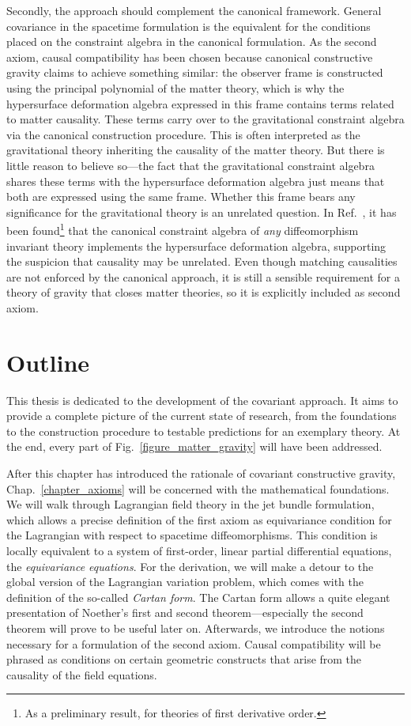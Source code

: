 Secondly, the approach should complement the canonical framework. General covariance in the spacetime formulation is the equivalent for the conditions placed on the constraint algebra in the canonical formulation. As the second axiom, causal compatibility has been chosen because canonical constructive gravity claims to achieve something similar: the observer frame is constructed using the principal polynomial of the matter theory, which is why the hypersurface deformation algebra expressed in this frame contains terms related to matter causality. These terms carry over to the gravitational constraint algebra via the canonical construction procedure. This is often interpreted as the gravitational theory inheriting the causality of the matter theory. But there is little reason to believe so---the fact that the gravitational constraint algebra shares these terms with the hypersurface deformation algebra just means that both are expressed using the same frame. Whether this frame bears any significance for the gravitational theory is an unrelated question. In Ref.\ \cite{Reinhart_2019}, it has been found\footnote{As a preliminary result, for theories of first derivative order.} that the canonical constraint algebra of \emph{any} diffeomorphism invariant theory implements the hypersurface deformation algebra, supporting the suspicion that causality may be unrelated. Even though matching causalities are not enforced by the canonical approach, it is still a sensible requirement for a theory of gravity that closes matter theories, so it is explicitly included as second axiom.

\section{Outline}

This thesis is dedicated to the development of the covariant approach. It aims to provide a complete picture of the current state of research, from the foundations to the construction procedure to testable predictions for an exemplary theory. At the end, every part of Fig.~\ref{figure_matter_gravity} will have been addressed.

After this chapter has introduced the rationale of covariant constructive gravity, Chap.~\ref{chapter_axioms} will be concerned with the mathematical foundations. We will walk through Lagrangian field theory in the jet bundle formulation, which allows a precise definition of the first axiom as equivariance condition for the Lagrangian with respect to spacetime diffeomorphisms. This condition is locally equivalent to a system of first-order, linear partial differential equations, the \emph{equivariance equations}. For the derivation, we will make a detour to the global version of the Lagrangian variation problem, which comes with the definition of the so-called \emph{Cartan form}. The Cartan form allows a quite elegant presentation of Noether's first and second theorem---especially the second theorem will prove to be useful later on. Afterwards, we introduce the notions necessary for a formulation of the second axiom. Causal compatibility will be phrased as conditions on certain geometric constructs that arise from the causality of the field equations.

